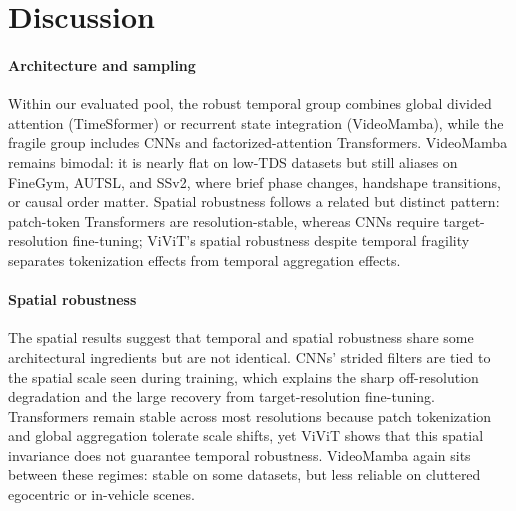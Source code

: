 \documentclass[a4paper, 10pt, conference]{ieeeconf}
\newcommand{\TDS}{\textsc{TDS}}
\begin{document}
\section{Discussion}
\label{sec:discussion}

\paragraph{Architecture and sampling}
Within our evaluated pool, the robust temporal group combines global divided attention (TimeSformer) or recurrent state integration (VideoMamba), while the fragile group includes CNNs and factorized-attention Transformers. VideoMamba remains bimodal: it is nearly flat on low-\TDS{} datasets but still aliases on FineGym, AUTSL, and SSv2, where brief phase changes, handshape transitions, or causal order matter. Spatial robustness follows a related but distinct pattern: patch-token Transformers are resolution-stable, whereas CNNs require target-resolution fine-tuning; ViViT's spatial robustness despite temporal fragility separates tokenization effects from temporal aggregation effects.

\paragraph{Spatial robustness}
The spatial results suggest that temporal and spatial robustness share some architectural ingredients but are not identical. CNNs' strided filters are tied to the spatial scale seen during training, which explains the sharp off-resolution degradation and the large recovery from target-resolution fine-tuning. Transformers remain stable across most resolutions because patch tokenization and global aggregation tolerate scale shifts, yet ViViT shows that this spatial invariance does not guarantee temporal robustness. VideoMamba again sits between these regimes: stable on some datasets, but less reliable on cluttered egocentric or in-vehicle scenes.
\end{document}
